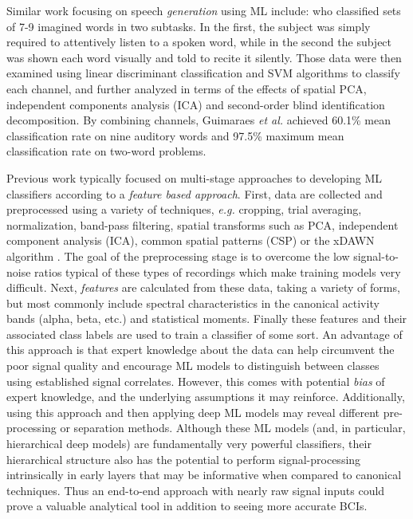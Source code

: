 \documentclass[utf8]{frontiersSCNS} %
\begin{document}

Similar work focusing on speech \emph{generation} using ML include: \cite{Guimaraes2007} who classified sets of 7-9 imagined words in two subtasks. In the first, the subject was simply required to attentively listen to a spoken word, while in the second the subject was shown each word visually and told to recite it silently. Those data were then examined using linear discriminant classification and SVM algorithms to classify each channel, and further analyzed in terms of the effects of spatial PCA, independent components analysis (ICA) and second-order blind identification decomposition. By combining channels, Guimaraes {\em et al.} achieved 60.1\% mean classification rate on nine auditory words and 97.5\% maximum mean classification rate on two-word problems.


Previous work typically focused on multi-stage approaches to developing ML classifiers according to a \emph{feature based approach}. First, data are collected and preprocessed using a variety of techniques, \emph{e.g.} cropping, trial averaging, normalization, band-pass filtering, spatial transforms such as PCA, independent component analysis (ICA), common spatial patterns (CSP) \cite{Muller-Gerking1999} or the xDAWN algorithm \cite{Rivet2009}. The goal of the preprocessing stage is to overcome the low signal-to-noise ratios typical of these types of recordings which make training models very difficult. Next, \emph{features} are calculated from these data, taking a variety of forms, but most commonly include spectral characteristics in the canonical activity bands (alpha, beta, etc.) and statistical moments. Finally these features and their associated class labels are used to train a classifier of some sort. An advantage of this approach is that expert knowledge about the data can help circumvent the poor signal quality and encourage ML models to distinguish between classes using established signal correlates. However, this comes with potential \emph{bias} of expert knowledge, and the underlying assumptions it may reinforce. Additionally, using this approach and then applying deep ML models may reveal different pre-processing or separation methods. Although these ML models (and, in particular, hierarchical deep models) are fundamentally very powerful classifiers, their hierarchical structure also has the potential to perform signal-processing intrinsically in early layers that may be informative when compared to canonical techniques. Thus an end-to-end approach with nearly raw signal inputs could prove a valuable analytical tool in addition to seeing more accurate BCIs.
\end{document}
